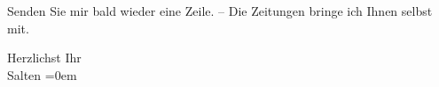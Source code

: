 \pstart
           Senden Sie mir bald wieder eine Zeile. – Die Zeitungen bringe ich Ihnen selbst
               mit.\pend
           
\pstart
           Herzlichst Ihr {\\[\baselineskip]}\spacefill\mbox{Salten}\pend
           \leftskip=0em{}\endnumbering{}  
      